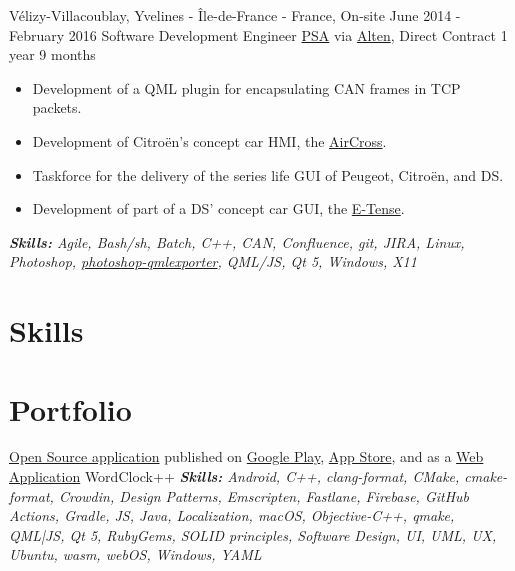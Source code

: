 \documentclass[11pt,a4paper,roman]{moderncv}
\begin{document}
\cventry
{Vélizy-Villacoublay, Yvelines - Île-de-France - France, On-site}
{June 2014 - February 2016}
{Software Development Engineer}
{\href{https://www.groupe-psa.com/en/}{PSA} via \href{https://www.alten.com}{Alten}, Direct Contract}
{1 year 9 months}
{}
{
\begin{itemize}
	\item Development of a QML plugin for encapsulating CAN frames in TCP packets.
	\item Development of Citroën's concept car HMI, the
	\href{https://www.media.stellantis.com/em-en/citroen/press/new-citroen-aircross-concept-car-an-invitation-to-travel-citroen-style}{AirCross}.
\item Taskforce for the delivery of the series life GUI of Peugeot, Citroën, and DS.
\item Development of part of a DS' concept car GUI, the \href{https://www.dsautomobiles.co.uk/ds-experience/concept-cars/ds-e-tense-performance.html}{E-Tense}.
\end{itemize}
{\textcolor{color2}{\textit{\textbf{Skills:}
	Agile,
	Bash/sh,
	Batch,
	C++,
	CAN,
	Confluence,
	git,
	JIRA,
	Linux,
	Photoshop,
	\href{https://github.com/qt-labs/photoshop-qmlexporter}{photoshop-qmlexporter},
	QML/JS,
	Qt 5,
	Windows,
	X11
}}}}

\section{Skills}


\section{Portfolio}

\cventry
{}
{\href{https://github.com/kokleeko/WordClock}{Open Source application} published on \href{http://wordclock-android.kokleeko.io/}{Google Play}, \href{http://wordclock-ios.kokleeko.io/}{App Store}, and as a \href{http://wordclock.kokleeko.io/}{Web Application}}
{WordClock++}
{}
{}
{
{\textcolor{color2}{\textit{\textbf{Skills:}
	Android,
	C++,
	clang-format,
	CMake,
	cmake-format,
	Crowdin,
	Design Patterns,
	Emscripten,
	Fastlane,
	Firebase,
	GitHub Actions,
	Gradle,
	JS,
	Java,
	Localization,
	macOS,
	Objective-C++,
	qmake,
	QML|JS,
	Qt 5,
	RubyGems,
	SOLID principles,
	Software Design,
	UI,
	UML,
	UX,
	Ubuntu,
	wasm,
	webOS,
	Windows,
	YAML
}}}}
\end{document}
